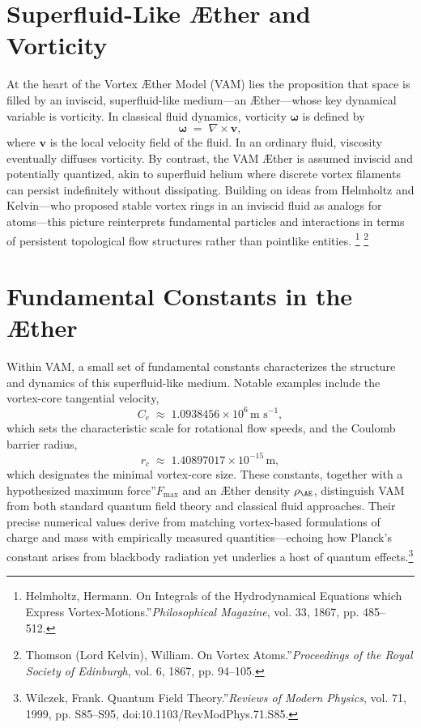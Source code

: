 
\section{Superfluid-Like Æther and Vorticity}

At the heart of the Vortex Æther Model (VAM) lies the proposition that space is filled by an inviscid, superfluid-like medium—an Æther—whose key dynamical variable is vorticity. In classical fluid dynamics, vorticity \(\boldsymbol{\omega}\) is defined by
\[
    \boldsymbol{\omega} \;=\; \nabla \times \mathbf{v},
\]
where \(\mathbf{v}\) is the local velocity field of the fluid. In an ordinary fluid, viscosity eventually diffuses vorticity. By contrast, the VAM Æther is assumed inviscid and potentially quantized, akin to superfluid helium where discrete vortex filaments can persist indefinitely without dissipating. Building on ideas from Helmholtz and Kelvin—who proposed stable vortex rings in an inviscid fluid as analogs for atoms—this picture reinterprets fundamental particles and interactions in terms of persistent topological flow structures rather than pointlike entities.
\footnote{Helmholtz, Hermann. \grqq On Integrals of the Hydrodynamical Equations which Express Vortex-Motions.\textquotedblright \textit{Philosophical Magazine}, vol. 33, 1867, pp. 485–512.}
\footnote{Thomson (Lord Kelvin), William. \grqq On Vortex Atoms.\textquotedblright \textit{Proceedings of the Royal Society of Edinburgh}, vol. 6, 1867, pp. 94–105.}

\section{Fundamental Constants in the Æther}

Within VAM, a small set of fundamental constants characterizes the structure and dynamics of this superfluid-like medium. Notable examples include the vortex-core tangential velocity,
\[
    C_{e} \;\approx\; 1.0938456 \times 10^{6} \, \text{m s}^{-1},
\]
which sets the characteristic scale for rotational flow speeds, and the Coulomb barrier radius,
\[
    r_{c} \;\approx\; 1.40897017 \times 10^{-15} \, \text{m},
\]
which designates the minimal vortex-core size. These constants, together with a hypothesized \grqq maximum force\textquotedblright \(F_{\max}\) and an Æther density \(\rho_{\mathrm{\AE}}\), distinguish VAM from both standard quantum field theory and classical fluid approaches. Their precise numerical values derive from matching vortex-based formulations of charge and mass with empirically measured quantities—echoing how Planck's constant arises from blackbody radiation yet underlies a host of quantum effects.\footnote{Wilczek, Frank. \grqq Quantum Field Theory.\textquotedblright \textit{Reviews of Modern Physics}, vol. 71, 1999, pp. S85–S95, doi:10.1103/RevModPhys.71.S85.}

